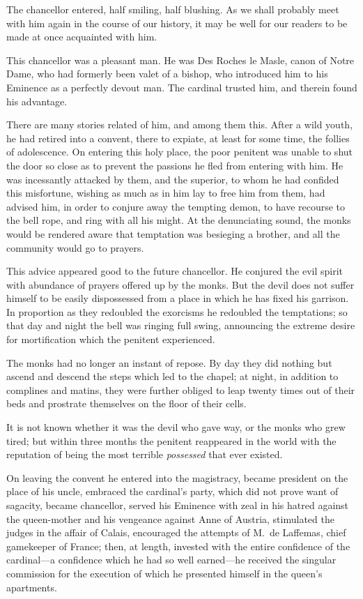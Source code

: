 The chancellor entered, half smiling, half blushing. As we shall probably meet with him again in the course of our history, it may be well for our readers to be made at once acquainted with him. 

This chancellor was a pleasant man. He was Des Roches le Masle, canon of Notre Dame, who had formerly been valet of a bishop, who introduced him to his Eminence as a perfectly devout man. The cardinal trusted him, and therein found his advantage. 

There are many stories related of him, and among them this. After a wild youth, he had retired into a convent, there to expiate, at least for some time, the follies of adolescence. On entering this holy place, the poor penitent was unable to shut the door so close as to prevent the passions he fled from entering with him. He was incessantly attacked by them, and the superior, to whom he had confided this misfortune, wishing as much as in him lay to free him from them, had advised him, in order to conjure away the tempting demon, to have recourse to the bell rope, and ring with all his might. At the denunciating sound, the monks would be rendered aware that temptation was besieging a brother, and all the community would go to prayers. 

This advice appeared good to the future chancellor. He conjured the evil spirit with abundance of prayers offered up by the monks. But the devil does not suffer himself to be easily dispossessed from a place in which he has fixed his garrison. In proportion as they redoubled the exorcisms he redoubled the temptations; so that day and night the bell was ringing full swing, announcing the extreme desire for mortification which the penitent experienced. 

The monks had no longer an instant of repose. By day they did nothing but ascend and descend the steps which led to the chapel; at night, in addition to complines and matins, they were further obliged to leap twenty times out of their beds and prostrate themselves on the floor of their cells. 

It is not known whether it was the devil who gave way, or the monks who grew tired; but within three months the penitent reappeared in the world with the reputation of being the most terrible \emph{possessed} that ever existed. 

On leaving the convent he entered into the magistracy, became president on the place of his uncle, embraced the cardinal's party, which did not prove want of sagacity, became chancellor, served his Eminence with zeal in his hatred against the queen-mother and his vengeance against Anne of Austria, stimulated the judges in the affair of Calais, encouraged the attempts of M.~de Laffemas, chief gamekeeper of France; then, at length, invested with the entire confidence of the cardinal—a confidence which he had so well earned—he received the singular commission for the execution of which he presented himself in the queen's apartments. 

